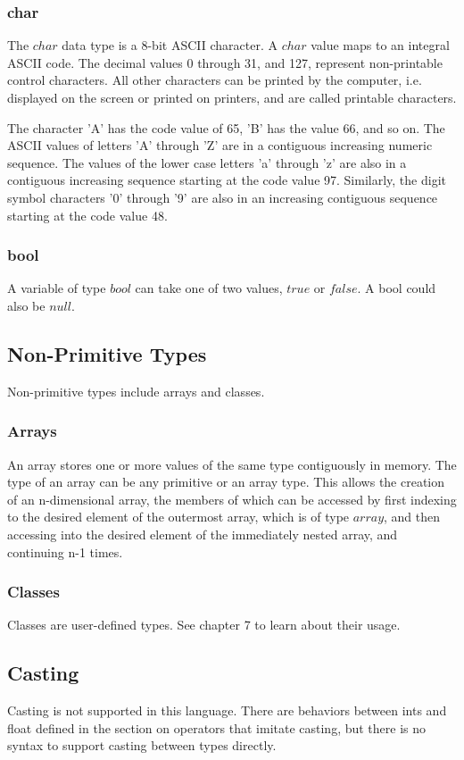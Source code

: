 \begin{homeworkProblem}
	\subsubsection{char}
	
	The $char$ data type is a 8-bit ASCII character. A $char$ value maps to an integral ASCII code. The decimal values 0 through 31, and 127, represent non-printable control characters. All other characters can be printed by the computer, i.e. displayed on the screen or printed on printers, and are called printable characters.
	
	The character 'A' has the code value of 65, 'B' has the value 66, and so on. The ASCII values of letters 'A' through 'Z' are in a contiguous increasing numeric sequence. The values of the lower case letters 'a' through 'z' are also in a contiguous increasing sequence starting at the code value 97. Similarly, the digit symbol characters '0' through '9' are also in an increasing contiguous sequence starting at the code value 48.
	
	\subsubsection{bool}
	
	A variable of type $bool$ can take one of two values, $true$ or $false$. A bool could also be $null$.\\
	
	\subsection{Non-Primitive Types}
	Non-primitive types include arrays and classes.
	\subsubsection{Arrays}
	An array stores one or more values of the same type contiguously in memory. The type of an array can be any primitive or an array type. This allows the creation of an n-dimensional array, the members of which can be accessed by first indexing to the desired element of the outermost array, which is of type $array$, and then accessing into the desired element of the immediately nested array, and continuing n-1 times.
	
	\subsubsection{Classes}
	
	Classes are user-defined types. See chapter 7 to learn about their usage.
	
	\subsection{Casting}
	Casting is not supported in this language. There are behaviors between ints and float defined in the section on operators that imitate casting, but there is no syntax to support casting between types directly. 
	
\end{homeworkProblem}
